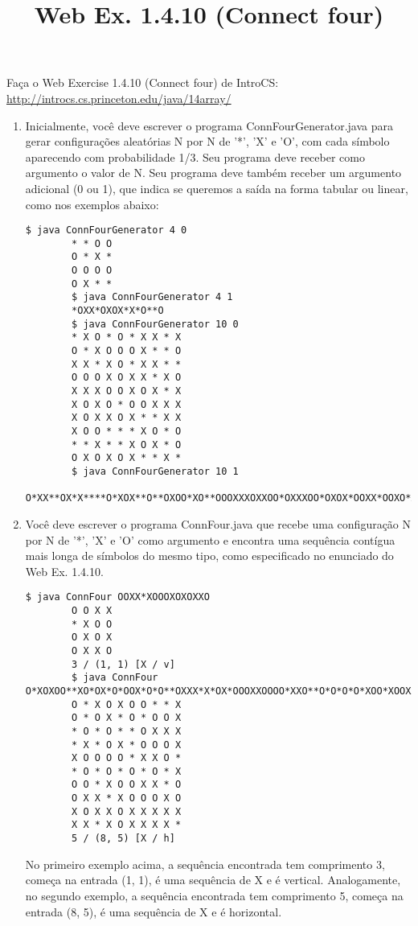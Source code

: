 \documentclass{article}
\title{Web Ex. 1.4.10 (Connect four)}
\date{}
\author{}
\begin{document}
\maketitle

Fa\c{c}a o Web Exercise 1.4.10 (Connect four) de IntroCS:
\bigbreak
\url{http://introcs.cs.princeton.edu/java/14array/}
\bigbreak

\begin{enumerate}[i]
	\item Inicialmente, voc\^e deve escrever o programa ConnFourGenerator.java para gerar configura\c{c}\~oes aleat\'orias N por N de '*', 'X' e 'O', com cada s\'imbolo aparecendo com probabilidade 1/3. Seu programa deve receber como argumento o valor de N. Seu programa deve tamb\'em receber um argumento adicional (0 ou 1), que indica se queremos a sa\'ida na forma tabular ou linear, como nos exemplos abaixo:
	\begin{lstlisting}[breaklines, gobble=16]
		$ java ConnFourGenerator 4 0
		* * O O 
		O * X * 
		O O O O 
		O X * * 
		$ java ConnFourGenerator 4 1
		*OXX*OXOX*X*O**O
		$ java ConnFourGenerator 10 0
		* X O * O * X X * X 
		O * X O O O X * * O 
		X X * X O * X X * * 
		O O O X O X X * X O 
		X X X O O X O X * X 
		X O X O * O O X X X 
		X O X X O X * * X X 
		X O O * * * X O * O 
		* * X * * X O X * O 
		O X O X O X * * X * 
		$ java ConnFourGenerator 10 1
		O*XX**OX*X****O*XOX**O**OXOO*XO**OOOXXXOXXOO*OXXXOO*OXOX*OOXX*OOXO*XXXOX*OXO*O*O**XO*OXO*XXO**XXO*OX
	\end{lstlisting}
	\item Voc\^e deve escrever o programa ConnFour.java que recebe uma configura\c{c}\~ao N por N de '*', 'X' e 'O' como argumento e encontra uma sequ\^encia cont\'igua mais longa de s\'imbolos do mesmo tipo, como especificado no enunciado do Web Ex. 1.4.10.
	\begin{lstlisting}[breaklines, gobble=16]
		$ java ConnFour OOXX*XOOOXOXOXXO
		O O X X 
		* X O O 
		O X O X 
		O X X O 
		3 / (1, 1) [X / v]
		$ java ConnFour O*XOXOO**XO*OX*O*OOX*O*O**OXXX*X*OX*OOOXXOOOO*XXO**O*O*O*O*XOO*XOOXX*OOXX*XOOOXOXOXXOXXXXXXX*XOXXXX*
		O * X O X O O * * X 
		O * O X * O * O O X 
		* O * O * * O X X X 
		* X * O X * O O O X 
		X O O O O * X X O * 
		* O * O * O * O * X 
		O O * X O O X X * O 
		O X X * X O O O X O 
		X O X X O X X X X X 
		X X * X O X X X X * 
		5 / (8, 5) [X / h]
	\end{lstlisting}
	No primeiro exemplo acima, a sequ\^encia encontrada tem comprimento 3, começa na entrada (1, 1), \'e uma sequ\^encia de X e \'e vertical. Analogamente, no segundo exemplo, a sequ\^encia encontrada tem comprimento 5, come\c{c}a na entrada (8, 5), \'e uma sequência de X e \'e horizontal.
\end{enumerate}
\end{document}
